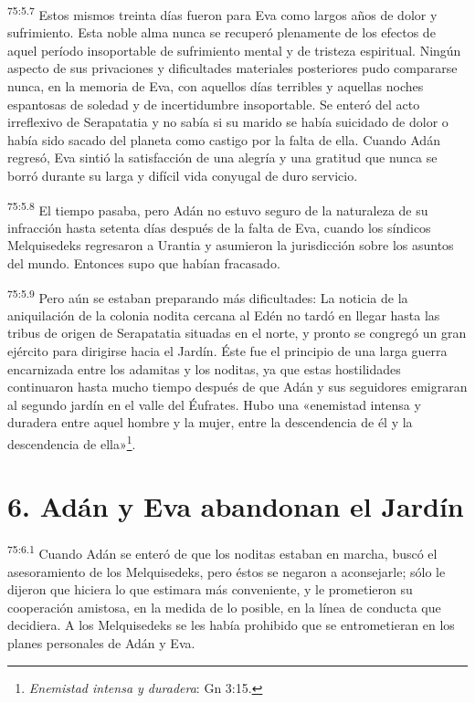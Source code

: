 \par
\textsuperscript{75:5.7} Estos mismos treinta días fueron para Eva como largos años de dolor y sufrimiento. Esta noble alma nunca se recuperó plenamente de los efectos de aquel período insoportable de sufrimiento mental y de tristeza espiritual. Ningún aspecto de sus privaciones y dificultades materiales posteriores pudo compararse nunca, en la memoria de Eva, con aquellos días terribles y aquellas noches espantosas de soledad y de incertidumbre insoportable. Se enteró del acto irreflexivo de Serapatatia y no sabía si su marido se había suicidado de dolor o había sido sacado del planeta como castigo por la falta de ella. Cuando Adán regresó, Eva sintió la satisfacción de una alegría y una gratitud que nunca se borró durante su larga y difícil vida conyugal de duro servicio.

\par
\textsuperscript{75:5.8} El tiempo pasaba, pero Adán no estuvo seguro de la naturaleza de su infracción hasta setenta días después de la falta de Eva, cuando los síndicos Melquisedeks regresaron a Urantia y asumieron la jurisdicción sobre los asuntos del mundo. Entonces supo que habían fracasado.

\par
\textsuperscript{75:5.9} Pero aún se estaban preparando más dificultades: La noticia de la aniquilación de la colonia nodita cercana al Edén no tardó en llegar hasta las tribus de origen de Serapatatia situadas en el norte, y pronto se congregó un gran ejército para dirigirse hacia el Jardín. Éste fue el principio de una larga guerra encarnizada entre los adamitas y los noditas, ya que estas hostilidades continuaron hasta mucho tiempo después de que Adán y sus seguidores emigraran al segundo jardín en el valle del Éufrates. Hubo una «enemistad intensa y duradera entre aquel hombre y la mujer, entre la descendencia de él y la descendencia de ella»\footnote{\textit{Enemistad intensa y duradera}: Gn 3:15.}.

\section*{6. Adán y Eva abandonan el Jardín}
\par
\textsuperscript{75:6.1} Cuando Adán se enteró de que los noditas estaban en marcha, buscó el asesoramiento de los Melquisedeks, pero éstos se negaron a aconsejarle; sólo le dijeron que hiciera lo que estimara más conveniente, y le prometieron su cooperación amistosa, en la medida de lo posible, en la línea de conducta que decidiera. A los Melquisedeks se les había prohibido que se entrometieran en los planes personales de Adán y Eva.

